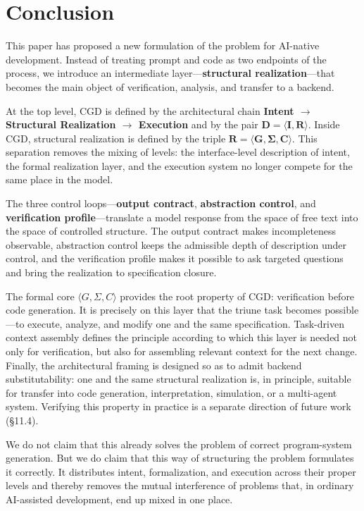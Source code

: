 \documentclass[12pt,a4paper]{article}
\begin{document}
\section{Conclusion}

This paper has proposed a new formulation of the problem for AI-native development. Instead of treating prompt and code as two endpoints of the process, we introduce an intermediate layer---\textbf{structural realization}---that becomes the main object of verification, analysis, and transfer to a backend.

At the top level, CGD is defined by the architectural chain \textbf{Intent $\to$ Structural Realization $\to$ Execution} and by the pair $\mathbf{D = \langle I, R \rangle}$. Inside CGD, structural realization is defined by the triple $\mathbf{R = \langle G, \Sigma, C \rangle}$. This separation removes the mixing of levels: the interface-level description of intent, the formal realization layer, and the execution system no longer compete for the same place in the model.

The three control loops---\textbf{output contract}, \textbf{abstraction control}, and \textbf{verification profile}---translate a model response from the space of free text into the space of controlled structure. The output contract makes incompleteness observable, abstraction control keeps the admissible depth of description under control, and the verification profile makes it possible to ask targeted questions and bring the realization to specification closure.

The formal core $\langle G, \Sigma, C \rangle$ provides the root property of CGD: verification before code generation. It is precisely on this layer that the triune task becomes possible---to execute, analyze, and modify one and the same specification. Task-driven context assembly defines the principle according to which this layer is needed not only for verification, but also for assembling relevant context for the next change. Finally, the architectural framing is designed so as to admit backend substitutability: one and the same structural realization is, in principle, suitable for transfer into code generation, interpretation, simulation, or a multi-agent system. Verifying this property in practice is a separate direction of future work (\S11.4).

We do not claim that this already solves the problem of correct program-system generation. But we do claim that this way of structuring the problem formulates it correctly. It distributes intent, formalization, and execution across their proper levels and thereby removes the mutual interference of problems that, in ordinary AI-assisted development, end up mixed in one place.
\end{document}
